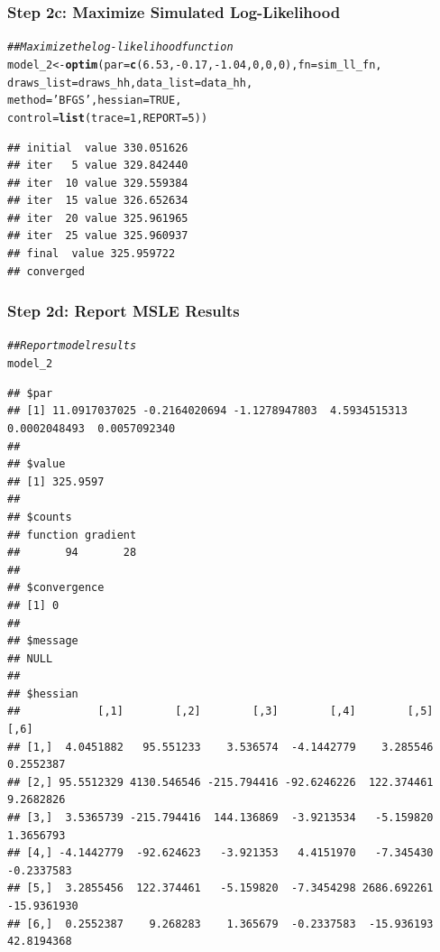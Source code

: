\documentclass{beamer}\usepackage[]{graphicx}\usepackage[]{xcolor}
\makeatletter
\newcommand{\hlnum}[1]{\textcolor[rgb]{0.686,0.059,0.569}{#1}}%
\newcommand{\hlstr}[1]{\textcolor[rgb]{0.192,0.494,0.8}{#1}}%
\newcommand{\hlcom}[1]{\textcolor[rgb]{0.678,0.584,0.686}{\textit{#1}}}%
\newcommand{\hlopt}[1]{\textcolor[rgb]{0,0,0}{#1}}%
\newcommand{\hlstd}[1]{\textcolor[rgb]{0.345,0.345,0.345}{#1}}%
\newcommand{\hlkwb}[1]{\textcolor[rgb]{0.69,0.353,0.396}{#1}}%
\newcommand{\hlkwc}[1]{\textcolor[rgb]{0.333,0.667,0.333}{#1}}%
\newcommand{\hlkwd}[1]{\textcolor[rgb]{0.737,0.353,0.396}{\textbf{#1}}}%
\newenvironment{kframe}{%
 \def\at@end@of@kframe{}%
 \ifinner\ifhmode%
  \def\at@end@of@kframe{\end{minipage}}%
  \begin{minipage}{\columnwidth}%
 \fi\fi%
 \def\FrameCommand##1{\hskip\@totalleftmargin \hskip-\fboxsep
 \colorbox{shadecolor}{##1}\hskip-\fboxsep
     \hskip-\linewidth \hskip-\@totalleftmargin \hskip\columnwidth}%
 \MakeFramed {\advance\hsize-\width
   \@totalleftmargin\z@ \linewidth\hsize
   \@setminipage}}%
 {\par\unskip\endMakeFramed%
 \at@end@of@kframe}
\newenvironment{knitrout}{}{} %
\makeatother
\begin{document}
\begin{frame}[fragile]\frametitle{Step 2c: Maximize Simulated Log-Likelihood}
\begin{knitrout}\footnotesize
{}\color{fgcolor}\begin{kframe}
\begin{alltt}
\hlcom{## Maximize the log-likelihood function}
\hlstd{model_2} \hlkwb{<-} \hlkwd{optim}\hlstd{(}\hlkwc{par} \hlstd{=} \hlkwd{c}\hlstd{(}\hlnum{6.53}\hlstd{,} \hlopt{-}\hlnum{0.17}\hlstd{,} \hlopt{-}\hlnum{1.04}\hlstd{,} \hlnum{0}\hlstd{,} \hlnum{0}\hlstd{,} \hlnum{0}\hlstd{),} \hlkwc{fn} \hlstd{= sim_ll_fn,}
                 \hlkwc{draws_list} \hlstd{= draws_hh,} \hlkwc{data_list} \hlstd{= data_hh,}
                 \hlkwc{method} \hlstd{=} \hlstr{'BFGS'}\hlstd{,} \hlkwc{hessian} \hlstd{=} \hlnum{TRUE}\hlstd{,}
                 \hlkwc{control} \hlstd{=} \hlkwd{list}\hlstd{(}\hlkwc{trace} \hlstd{=} \hlnum{1}\hlstd{,} \hlkwc{REPORT} \hlstd{=} \hlnum{5}\hlstd{))}
\end{alltt}
\begin{verbatim}
## initial  value 330.051626 
## iter   5 value 329.842440
## iter  10 value 329.559384
## iter  15 value 326.652634
## iter  20 value 325.961965
## iter  25 value 325.960937
## final  value 325.959722 
## converged
\end{verbatim}
\end{kframe}
\end{knitrout}
\end{frame}

\begin{frame}[fragile]\frametitle{Step 2d: Report MSLE Results}
    
\begin{knitrout}\tiny
{}\color{fgcolor}\begin{kframe}
\begin{alltt}
\hlcom{## Report model results}
\hlstd{model_2}
\end{alltt}
\begin{verbatim}
## $par
## [1] 11.0917037025 -0.2164020694 -1.1278947803  4.5934515313  0.0002048493  0.0057092340
## 
## $value
## [1] 325.9597
## 
## $counts
## function gradient 
##       94       28 
## 
## $convergence
## [1] 0
## 
## $message
## NULL
## 
## $hessian
##            [,1]        [,2]        [,3]        [,4]        [,5]        [,6]
## [1,]  4.0451882   95.551233    3.536574  -4.1442779    3.285546   0.2552387
## [2,] 95.5512329 4130.546546 -215.794416 -92.6246226  122.374461   9.2682826
## [3,]  3.5365739 -215.794416  144.136869  -3.9213534   -5.159820   1.3656793
## [4,] -4.1442779  -92.624623   -3.921353   4.4151970   -7.345430  -0.2337583
## [5,]  3.2855456  122.374461   -5.159820  -7.3454298 2686.692261 -15.9361930
## [6,]  0.2552387    9.268283    1.365679  -0.2337583  -15.936193  42.8194368
\end{verbatim}
\end{kframe}
\end{knitrout}
\end{frame}
\end{document}
